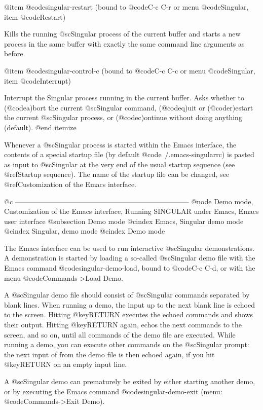 @item @code{singular-restart} (bound to @code{C-c C-r} or menu
@code{Singular}, item @code{Restart})

Kills the running @sc{Singular} process of the current buffer and starts
a new process in the same buffer with exactly the same command line
arguments as before.

@item @code{singular-control-c} (bound to @code{C-c C-c} or menu @code{Singular}, item @code{Interrupt})

Interrupt the Singular process running in the current buffer. Asks
whether to (@code{a})bort the current @sc{Singular} command,
(@code{q})uit or (@code{r})estart the current @sc{Singular} process, or
(@code{c})ontinue without doing anything (default).
@end itemize

Whenever a @sc{Singular} process is started within the Emacs interface,
the contents of a special startup file (by default
@code{~/.emacs-singularrc}) is pasted as input to @sc{Singular} at the
very end of the usual startup sequence (see @ref{Startup sequence}). The
name of the startup file can be changed, see
@ref{Customization of the Emacs interface}.


@c --------------------------------------------------------------------------
@node Demo mode, Customization of the Emacs interface, Running SINGULAR under Emacs, Emacs user interface
@subsection Demo mode
@cindex Emacs, Singular demo mode
@cindex Singular, demo mode
@cindex Demo mode

The Emacs interface can be used to run interactive @sc{Singular}
demonstrations. A demonstration is started by loading a so-called
@sc{Singular} demo file with the Emacs command
@code{singular-demo-load}, bound to
@code{C-c C-d}, or with the menu @code{Commands->Load Demo}.

A @sc{Singular} demo file should consist of @sc{Singular} commands
separated by blank lines. When running a demo, the input up to the next
blank line is echoed to the screen. Hitting @key{RETURN} executes the
echoed commands and shows their output. Hitting @key{RETURN} again,
echos the next commands to the screen, and so on, until all commands of
the demo file are executed. While running a demo, you can
execute other commands on the @sc{Singular} prompt: the next input of
from the demo file is then echoed again, if you hit @key{RETURN} on
an empty input line.

A @sc{Singular} demo can prematurely be exited by either starting
another demo, or by executing the Emacs command
@code{singular-demo-exit} (menu: @code{Commands->Exit Demo}).

